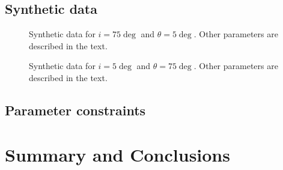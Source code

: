 \documentclass{wihuri}
\begin{document}
\subsection{Synthetic data}


\begin{figure}
\centerline{}
\caption{Synthetic data for $i = 75 \deg$ and $\theta = 5 \deg$. Other parameters are described in the text.
\label{fig:syntpol2}}
\end{figure}


\begin{figure}
\centerline{}
\caption{Synthetic data for $i = 5 \deg$ and $\theta = 75 \deg$. Other parameters are described in the text.
\label{fig:synteq2}}
\end{figure}


\subsection{Parameter constraints}

\iffalse
\begin{figure}
\centerline{\epsfig{file=syntsaxpol2_nph16nmg.pdf,width=12.0cm}}
\caption{Posterior probability distributions (Replace later with better image).
\label{fig:pol2posterior}}
\end{figure}
\fi



\section{Summary and Conclusions}










\iffalse
\begin{figure}
\begin{center}
\setlength{\unitlength}{1cm}
\begin{picture}(6,6)(-3,-3)
\put(-1.5,0){\vector(1,0){3}}
\put(2.7,-0.1){$\chi$}
\put(0,-1.5){\vector(0,1){3}}
\multiput(-2.5,1)(0.4,0){13}
{\line(1,0){0.2}}
\multiput(-2.5,-1)(0.4,0){13}
{\line(1,0){0.2}}
\put(0.2,1.4)
{$\beta=v/c=\tanh\chi$}
\qbezier(0,0)(0.8853,0.8853)
(2,0.9640)
\qbezier(0,0)(-0.8853,-0.8853)
(-2,-0.9640)
\end{picture}
\caption{Tässä on hieno kuva}
\label{kuva1}
\end{center}
\end{figure}
\fi
\end{document}
